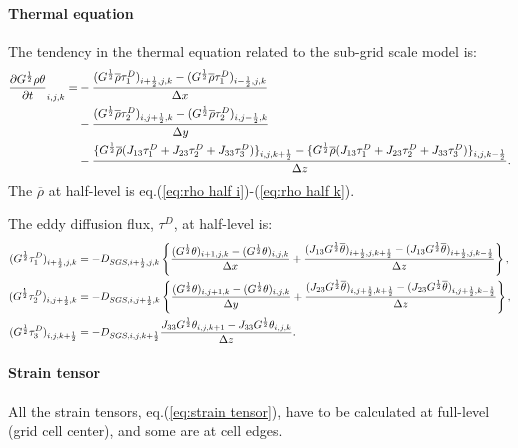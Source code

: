 \paragraph{Thermal equation}
The tendency in the thermal equation related to the sub-grid scale model is:
\begin{align}
  \frac{\partial G^{\frac{1}{2}}\rho \theta}{\partial t}_{i,j,k} =
  &- \frac{(G^{\frac{1}{2}}\overline{\rho}\tau^D_1)_{i+\frac{1}{2},j,k}-(G^{\frac{1}{2}}\overline{\rho}\tau^D_1)_{i-\frac{1}{2},j,k}}{\Delta x} \nonumber \\
  &- \frac{(G^{\frac{1}{2}}\overline{\rho}\tau^D_2)_{i,j+\frac{1}{2},k}-(G^{\frac{1}{2}}\overline{\rho}\tau^D_2)_{i,j-\frac{1}{2},k}}{\Delta y} \nonumber \\
  &- \frac{\{G^{\frac{1}{2}}\overline{\rho}(J_{13}\tau^D_1+J_{23}\tau^D_2+J_{33}\tau^D_3)\}_{i,j,k+\frac{1}{2}}
          -\{G^{\frac{1}{2}}\overline{\rho}(J_{13}\tau^D_1+J_{23}\tau^D_2+J_{33}\tau^D_3)\}_{i,j,k-\frac{1}{2}}}{\Delta z}.
\end{align}
The $\overline{\rho}$ at half-level is eq.(\ref{eq:rho half i})-(\ref{eq:rho half k}).

The eddy diffusion flux, $\tau^D$, at half-level is:
\begin{align}
  (G^{\frac{1}{2}}\tau^D_1)_{i+\frac{1}{2},j,k} &= -D_{SGS,i+\frac{1}{2},j,k} \left\{
  \frac{(G^{\frac{1}{2}}\theta)_{i+1,j,k}-(G^{\frac{1}{2}}\theta)_{i,j,k}}{\Delta x}
  + \frac{(J_{13}G^{\frac{1}{2}}\overline{\theta})_{i+\frac{1}{2},j,k+\frac{1}{2}}-(J_{13}G^{\frac{1}{2}}\overline{\theta})_{i+\frac{1}{2},j,k-\frac{1}{2}}}{\Delta z} \right\}, \\
  (G^{\frac{1}{2}}\tau^D_2)_{i,j+\frac{1}{2},k} &= -D_{SGS,i,j+\frac{1}{2},k} \left\{
  \frac{(G^{\frac{1}{2}}\theta)_{i,j+1,k}-(G^{\frac{1}{2}}\theta)_{i,j,k}}{\Delta y}
  + \frac{(J_{23}G^{\frac{1}{2}}\overline{\theta})_{i,j+\frac{1}{2},k+\frac{1}{2}}-(J_{23}G^{\frac{1}{2}}\overline{\theta})_{i,j+\frac{1}{2},k-\frac{1}{2}}}{\Delta z} \right\}, \\
  (G^{\frac{1}{2}}\tau^D_3)_{i,j,k+\frac{1}{2}} &= -D_{SGS,i,j,k+\frac{1}{2}} \frac{J_{33}G^{\frac{1}{2}}\theta_{i,j,k+1}-J_{33}G^{\frac{1}{2}}\theta_{i,j,k}}{\Delta z}.
\end{align}



\paragraph{Strain tensor}
All the strain tensors, eq.(\ref{eq:strain tensor}), have to be calculated at full-level (grid cell center), and some are at cell edges.

